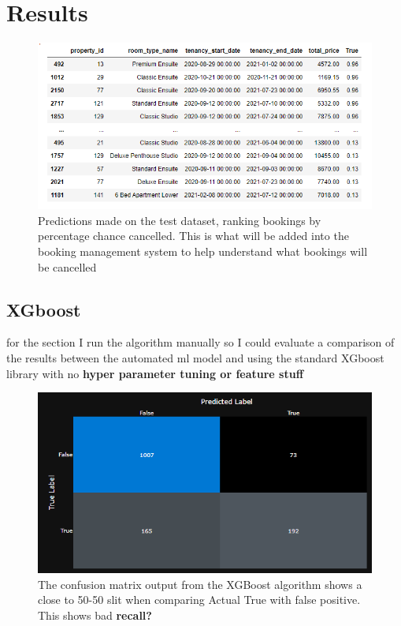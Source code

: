 \chapter{Results}
\label{ch:results}


\begin{figure}[hbt!]
 \includegraphics[width=15cm]{figures/canc_prob.png}
 \caption{Predictions made on the test dataset, ranking bookings by percentage chance cancelled. This is what will be added into the booking management system to help understand what bookings will be cancelled}
\end{figure}

\section{XGboost}

for the section I run the algorithm manually so I could evaluate a comparison of the results between the automated ml model and using the standard XGboost library with no \textbf{hyper parameter tuning or feature stuff}


\begin{figure}[hbt!]
 \includegraphics[width=15cm]{figures/azure_ml_confusion_matrix_xg.png}
 \caption{The confusion matrix output from the XGBoost algorithm shows a close to 50-50 slit when comparing Actual True with false positive. This shows bad \textbf{recall?}}
\end{figure}


